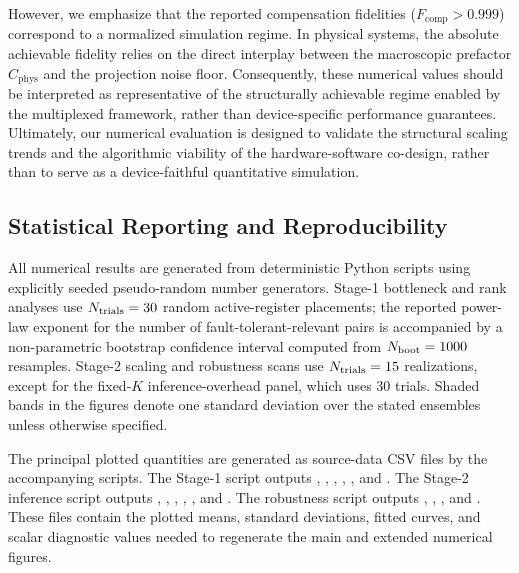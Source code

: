 \documentclass[a4paper,twocolumn,11pt]{quantumarticle}
\begin{document}
However, we emphasize that the reported compensation fidelities ($F_{\text{comp}} > 0.999$) correspond to a normalized simulation regime. In physical systems, the absolute achievable fidelity relies on the direct interplay between the macroscopic prefactor $C_{\text{phys}}$ and the projection noise floor. Consequently, these numerical values should be interpreted as representative of the structurally achievable regime enabled by the multiplexed framework, rather than device-specific performance guarantees. Ultimately, our numerical evaluation is designed to validate the structural scaling trends and the algorithmic viability of the hardware-software co-design, rather than to serve as a device-faithful quantitative simulation.




\subsection*{Statistical Reporting and Reproducibility}
All numerical results are generated from deterministic Python scripts using explicitly seeded pseudo-random number generators. Stage-1 bottleneck and rank analyses use $N_{\rm trials}=30$ random active-register placements; the reported power-law exponent for the number of fault-tolerant-relevant pairs is accompanied by a non-parametric bootstrap confidence interval computed from $N_{\rm boot}=1000$ resamples. Stage-2 scaling and robustness scans use $N_{\rm trials}=15$ realizations, except for the fixed-$K$ inference-overhead panel, which uses 30 trials. Shaded bands in the figures denote one standard deviation over the stated ensembles unless otherwise specified.

The principal plotted quantities are generated as source-data CSV files by the accompanying scripts. The Stage-1 script outputs , , , , , and . The Stage-2 inference script outputs , , , , , and . The robustness script outputs , , , and . These files contain the plotted means, standard deviations, fitted curves, and scalar diagnostic values needed to regenerate the main and extended numerical figures.
\end{document}
